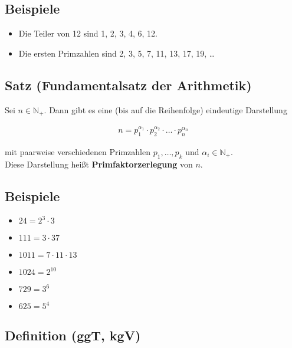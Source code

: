 \subsection{Beispiele}

	\begin{itemize}
		
		\item Die Teiler von 12 sind 1, 2, 3, 4, 6, 12.
		\item Die ersten Primzahlen sind 2, 3, 5, 7, 11, 13, 17, 19, \dots
	\end{itemize}
	
	
\subsection[Fundamentalsatz der Arithmetik]{Satz (Fundamentalsatz der Arithmetik)}

	Sei $n \in \mathbb{N_+}$. Dann gibt es eine (bis auf die Reihenfolge) eindeutige Darstellung
	
	\begin{align*}
	n = p_1^{\alpha_1} \cdot p_2^{\alpha_2} \cdot \ldots \cdot p_n^{\alpha_n}
	\end{align*}
	
	mit paarweise verschiedenen Primzahlen $p_1, \dots , p_k$ und $\alpha_i \in \mathbb{N_+}$. \\
	Diese Darstellung heißt \textbf{Primfaktorzerlegung} von $n$. 

	
\subsection{Beispiele}

	\begin{itemize}
	
	\item $24 = 2^3 \cdot 3$
	\item $111 = 3 \cdot 37$
	\item $1011=7\cdot 11\cdot 13$
	\item $1024 = 2^10$
	\item $729 = 3^6$
	\item $625 = 5^4$
	
	\end{itemize}
	
	
\subsection[ggT, kgV]{Definition (ggT, kgV)}
	
